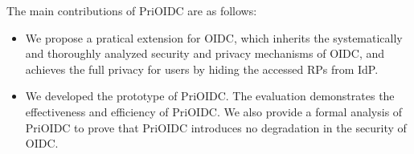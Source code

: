 
The main contributions of PriOIDC are as follows:
\begin{itemize}
\item We propose a pratical extension for OIDC, which inherits the systematically and thoroughly analyzed  security and privacy mechanisms of OIDC, and achieves the full privacy for users by hiding the accessed RPs from IdP.
\item We developed the prototype of PriOIDC. The evaluation demonstrates the effectiveness and efficiency of PriOIDC. We also provide a formal analysis of PriOIDC to prove that PriOIDC introduces no degradation  in the security of OIDC.
\end{itemize}


